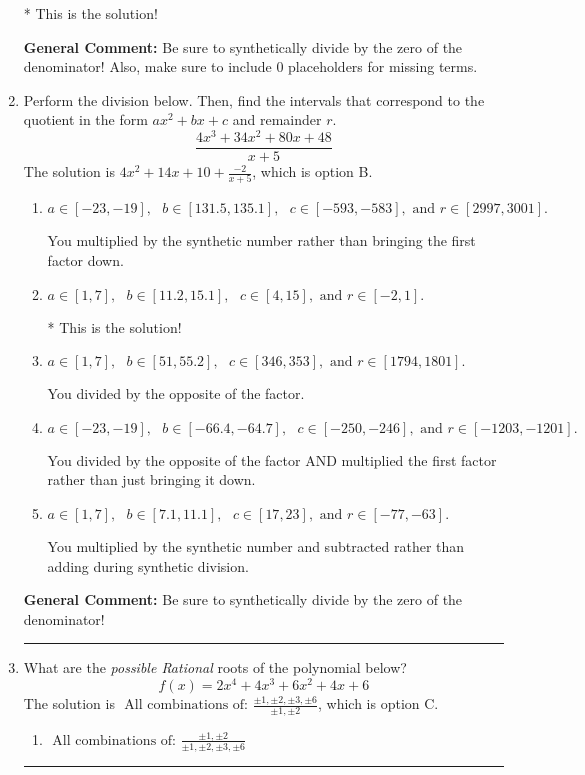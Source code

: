 \documentclass{extbook}[14pt]
\newcommand{\litem}[1]{\item #1

\rule{\textwidth}{0.4pt}}
\begin{document}
\begin{enumerate}
{\begin{enumerate}[label=\Alph*.]
* This is the solution!
\end{enumerate}

\textbf{General Comment:} Be sure to synthetically divide by the zero of the denominator! Also, make sure to include 0 placeholders for missing terms.
}
\litem{
Perform the division below. Then, find the intervals that correspond to the quotient in the form $ax^2+bx+c$ and remainder $r$.
\[ \frac{4x^{3} +34 x^{2} +80 x + 48}{x + 5} \]The solution is \( 4x^{2} +14 x + 10 + \frac{-2}{x + 5} \), which is option B.\begin{enumerate}[label=\Alph*.]
\item \( a \in [-23, -19], \text{   } b \in [131.5, 135.1], \text{   } c \in [-593, -583], \text{   and   } r \in [2997, 3001]. \)

 You multiplied by the synthetic number rather than bringing the first factor down.
\item \( a \in [1, 7], \text{   } b \in [11.2, 15.1], \text{   } c \in [4, 15], \text{   and   } r \in [-2, 1]. \)

* This is the solution!
\item \( a \in [1, 7], \text{   } b \in [51, 55.2], \text{   } c \in [346, 353], \text{   and   } r \in [1794, 1801]. \)

 You divided by the opposite of the factor.
\item \( a \in [-23, -19], \text{   } b \in [-66.4, -64.7], \text{   } c \in [-250, -246], \text{   and   } r \in [-1203, -1201]. \)

 You divided by the opposite of the factor AND multiplied the first factor rather than just bringing it down.
\item \( a \in [1, 7], \text{   } b \in [7.1, 11.1], \text{   } c \in [17, 23], \text{   and   } r \in [-77, -63]. \)

 You multiplied by the synthetic number and subtracted rather than adding during synthetic division.
\end{enumerate}

\textbf{General Comment:} Be sure to synthetically divide by the zero of the denominator!
}
\litem{
What are the \textit{possible Rational} roots of the polynomial below?
\[ f(x) = 2x^{4} +4 x^{3} +6 x^{2} +4 x + 6 \]The solution is \( \text{ All combinations of: }\frac{\pm 1,\pm 2,\pm 3,\pm 6}{\pm 1,\pm 2} \), which is option C.\begin{enumerate}[label=\Alph*.]
\item \( \text{ All combinations of: }\frac{\pm 1,\pm 2}{\pm 1,\pm 2,\pm 3,\pm 6} \)


\end{enumerate}}
\end{enumerate}
\end{document}
